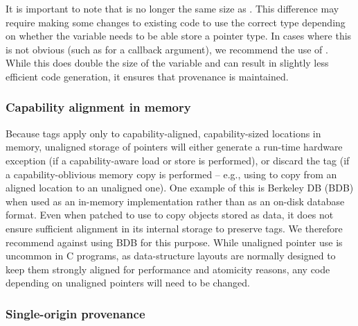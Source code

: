 \documentclass[12pt,twoside,openright,usletter]{article}
\newcommand{\ccode}[1]{{\small\ttfamily{#1}}}
\newcommand{\cfunc}[1]{{\ccode{#1()}}}
\newcommand{\sizet}{{\ccode{size\_t}}\xspace}
\newcommand{\cuintptrt}{{\ccode{uintptr\_t}}\xspace}
\newcommand{\note}[2]{{\color{blue}[ Note: #1 - #2]}}
\renewcommand{\note}[2]{\relax\ifhmode\unskip\fi}
\newcommand{\amnote}[1]{\note{#1}{Alfredo M.}}
\newcommand{\psnote}[1]{\note{#1}{Peter S.}}
\newcommand{\pgnnote}[1]{\note{#1}{Peter N.}}
\begin{document}
It is important to note that \cuintptrt is no longer the same size as
\sizet. This difference may require making some changes to
existing code to use the correct type depending on whether the variable
needs to be able store a pointer type. In cases where this is not obvious
(such as for a callback argument), we recommend the use of \cuintptrt.
While this does double the size of the variable and can result in slightly
less efficient code generation, it ensures that provenance is maintained.

\pgnnote{The above section begs questions relating to what is the
  responsibility of programmers and what can be aided or managed by
  compilers.  Ideally, the latter would be preferable to requiring
  programmers to understand things are are possibly beyond there so-called
  experience.}

\subsubsection{Capability alignment in memory}

Because tags apply only to capability-aligned, capability-sized locations in
memory, unaligned storage of pointers will either generate a run-time
hardware exception (if a capability-aware load or store is performed), or discard the
tag (if a capability-oblivious memory copy is performed -- e.g., using
\cfunc{memcpy} to copy from an aligned location to an unaligned one).
One example of this is Berkeley DB (BDB) when used as an in-memory
implementation rather than as an on-disk database format.
Even when patched to use \cfunc{memcpy} to copy objects stored as data, it
does not ensure sufficient alignment in its internal storage to preserve tags.
We therefore recommend against using BDB for this purpose.
While unaligned pointer use is uncommon in C programs, as data-structure
layouts are normally designed to keep them strongly aligned for performance
and atomicity reasons, any code depending on unaligned pointers will need
to be changed.

\amnote{Should we mention code that assumes that it is ok to go out of bounds
for optimization purposes? E.g., strcmp loading a word at a time?}
\psnote{yes}

\subsubsection{Single-origin provenance}
\label{sec:ambiguous-provenance}
\end{document}
